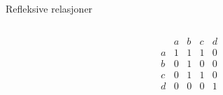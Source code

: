 \begin{frame}[fragile]{Refleksive relasjoner}
\begin{columns}
\begin{column}{0.3\textwidth}
\begin{math}
            \end{math}
        \end{column}
        \begin{column}{0.3\textwidth}
            \begin{math}
                \begin{matrix}
                      & a & b & c & d\\
                    a & 1 & 1 & 1 & 0\\
                    b & 0 & 1 & 0 & 0\\
                    c & 0 & 1 & 1 & 0\\
                    d & 0 & 0 & 0 & 1
                \end{matrix}
            \end{math}
        \end{column}
    \end{columns}
\end{frame}

